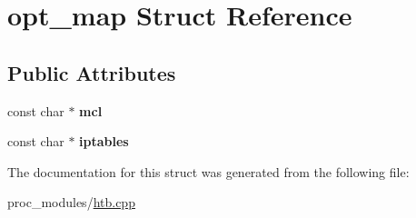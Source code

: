 \hypertarget{structopt__map}{}\section{opt\+\_\+map Struct Reference}
\label{structopt__map}
\subsection*{Public Attributes}
\begin{DoxyCompactItemize}
\item 
\mbox{\label{structopt__map_a882f881a898314cb4f25ec67224de6f7}} 
const char $\ast$ {\bfseries mcl}
\item 
\mbox{\label{structopt__map_a56bc1ec14240258881e159160a79694c}} 
const char $\ast$ {\bfseries iptables}
\end{DoxyCompactItemize}


The documentation for this struct was generated from the following file\+:\begin{DoxyCompactItemize}
\item 
proc\+\_\+modules/\hyperlink{htb_8cpp}{htb.\+cpp}\end{DoxyCompactItemize}
